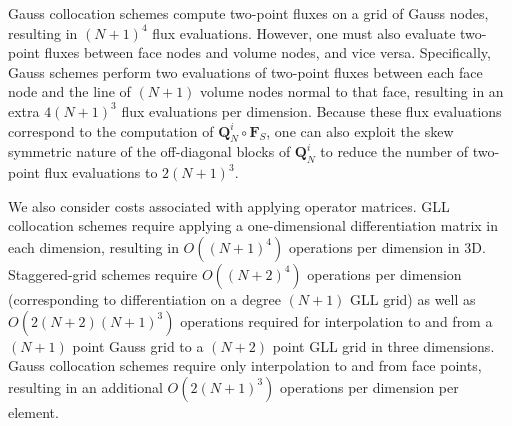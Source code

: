 \documentclass[review,onefignum,onetabnum,final]{siamart171218}
\newcommand{\LRp}[1]{\left( #1 \right)}
\begin{document}
Gauss collocation schemes compute two-point fluxes on a grid of Gauss nodes, resulting in $(N+1)^4$ flux evaluations.  However, one must also evaluate two-point fluxes between face nodes and volume nodes, and vice versa.  Specifically, Gauss schemes perform two evaluations of two-point fluxes between each face node and the line of $(N+1)$ volume nodes normal to that face, resulting in an extra $4(N+1)^3$ flux evaluations per dimension.  Because these flux evaluations correspond to the computation of $\bm{Q}^i_N\circ \bm{F}_S$, one can also exploit the skew symmetric nature of the off-diagonal blocks of $\bm{Q}^i_N$ to reduce the number of two-point flux evaluations to $2(N+1)^3$.  

We also consider costs associated with applying operator matrices.  GLL collocation schemes require applying a one-dimensional differentiation matrix in each dimension, resulting in $O\LRp{(N+1)^4}$ operations per dimension in 3D.  Staggered-grid schemes require $O\LRp{(N+2)^4}$ operations per dimension (corresponding to differentiation on a degree $(N+1)$ GLL grid) as well as $O\LRp{2(N+2)(N+1)^3}$ operations required for interpolation to and from a $(N+1)$ point Gauss grid to a $(N+2)$ point GLL grid in three dimensions.  Gauss collocation schemes require only interpolation to and from face points, resulting in an additional $O\LRp{2(N+1)^3}$ operations per dimension per element.  
\end{document}
